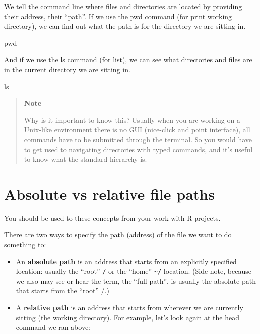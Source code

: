 \documentclass[
]{book}
\newenvironment{Shaded}{\begin{snugshade}}{\end{snugshade}}
\newcommand{\BuiltInTok}[1]{#1}
\newcommand{\FunctionTok}[1]{\textcolor[rgb]{0.00,0.00,0.00}{#1}}
\begin{document}
We tell the command line where files and directories are located by providing their address, their ``path''. If we use the pwd command (for print working directory), we can find out what the path is for the directory we are sitting in.

\begin{Shaded}
\begin{Highlighting}[]
    \BuiltInTok{pwd}
\end{Highlighting}
\end{Shaded}

And if we use the ls command (for list), we can see what directories and files are in the current directory we are sitting in.

\begin{Shaded}
\begin{Highlighting}[]
    \FunctionTok{ls}
\end{Highlighting}
\end{Shaded}

\begin{quote}
\textbf{Note}

Why is it important to know this? Usually when you are working on a Unix-like environment there is no GUI (nice-click and point interface), all commands have to be submitted through the terminal. So you would have to get used to navigating directories with typed commands, and it's useful to know what the standard hierarchy is.
\end{quote}

\hypertarget{absolute-vs-relative-file-paths}{%
\section{Absolute vs relative file paths}\label{absolute-vs-relative-file-paths}}

You should be used to these concepts from your work with R projects.

There are two ways to specify the path (address) of the file we want to do something to:

\begin{itemize}
\item
  An \textbf{absolute path} is an address that starts from an explicitly specified location: usually the ``root'' \texttt{/} or the ``home'' \texttt{\textasciitilde{}/} location. (Side note, because we also may see or hear the term, the ``full path'', is usually the absolute path that starts from the ``root'' /.)
\item
  A \textbf{relative path} is an address that starts from wherever we are currently sitting (the working directory). For example, let's look again at the head command we ran above:
\end{itemize}
\end{document}
